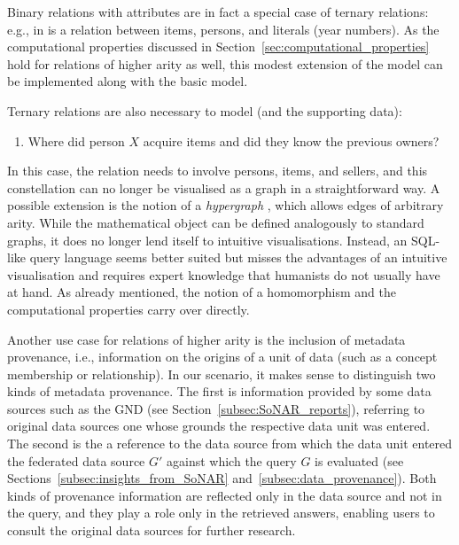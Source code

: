 Binary relations with attributes are in fact a special case of ternary relations: e.g.,  in 
is a relation between items, persons, and literals (year numbers).
As the computational properties discussed in Section~\ref{sec:computational_properties}
hold for relations of higher arity as well, this modest extension of the model can be implemented
along with the basic model.

Ternary relations are also necessary to model  (and the supporting data):
%
\begin{enumerate}
  \item[\exaquery{9}]
    Where did person $X$ acquire items and did they know the previous owners?
\end{enumerate}
%
In this case, the relation  needs to involve persons, items, and sellers,
and this constellation can no longer be visualised as a graph in a straightforward way.
A possible extension is the notion of a \emph{hypergraph} \autocite[§7.1]{Voloshin2009},
which allows edges of arbitrary arity.
While the mathematical object can be defined analogously to standard graphs,
it does no longer lend itself to intuitive visualisations.
Instead, an SQL-like query language seems better suited
but misses the advantages of an intuitive visualisation 
and requires expert knowledge that humanists do not usually have at hand.
As already mentioned, the notion of a homomorphism and the computational properties
carry over directly.

Another use case for relations of higher arity is the inclusion of metadata provenance,
i.e., information on the origins of a unit of data (such as a concept membership or relationship).
In our scenario, it makes sense to distinguish two kinds of
metadata provenance. The first is information provided by some data sources such as the \gls{GND}
(see Section~\ref{subsec:SoNAR_reports}), referring to original data sources one whose grounds
the respective data unit was entered.
The second is the a reference to the data source from which the data unit entered
the federated data source $G'$ against which the query $G$ is evaluated
(see Sections~\ref{subsec:insights_from_SoNAR} and~\ref{subsec:data_provenance}).
Both kinds of provenance information are reflected only in the data source
and not in the query, and they play a role only in the retrieved answers,
enabling users to consult the original data sources for further research.

